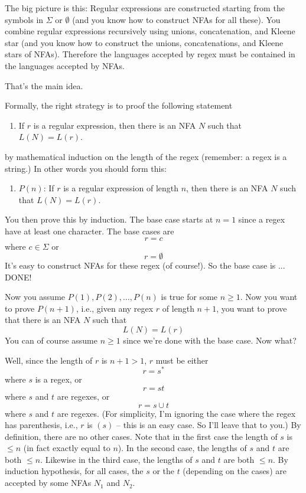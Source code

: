 

\newpage
The big picture is this:
Regular expressions are constructed starting from the symbols in $\Sigma$
or $\emptyset$
(and you know how to construct NFAs for all these).
You combine regular expressions recursively using
unions, concatenation, and Kleene star (and you know how to 
construct the unions, concatenations, and Kleene stars of NFAs).
Therefore the languages accepted by regex must be contained in the 
languages accepted by NFAs.

That's the main idea.

Formally, the right strategy is to proof the following statement
\begin{enumerate}
\item[]
If $r$ is a regular expression, then there is an NFA $N$
such that $L(N) = L(r)$.
\end{enumerate}
by mathematical induction on the length of the regex 
(remember: a regex is a string.)
In other words you should form this:
\begin{enumerate}
\item[]
$P(n)$: If $r$ is a regular expression of length $n$, 
then there is an NFA $N$
such that $L(N) = L(r)$.
\end{enumerate}

You then prove this by induction.
The base case starts at $n = 1$ since a regex have at least one character.
The base cases are 
\[
r = c
\]
where $c \in \Sigma$ or
\[
r = \emptyset
\]
It's easy to construct NFAs for these regex (of course!).
So the base case is ... DONE!

Now you assume $P(1), P(2), \ldots, P(n)$ is true for some $n \geq 1$.
Now you want to prove $P(n+1)$, i.e., 
given any regex $r$ of length $n + 1$, you want to 
prove that there is an NFA $N$ such that
\[
L(N) = L(r)
\]
You can of course assume $n \geq 1$ since we're done with the base case.
Now what?

Well, since the length of $r$ is $n + 1 > 1$, $r$ must be either
\[
r = s^*
\]
where $s$ is a regex, or
\[
r = st
\]
where $s$ and $t$ are regexes, or
\[
r = s \cup t
\]
where $s$ and $t$ are regexes.
(For simplicity, I'm ignoring the case where the regex has parenthesis,
i.e., $r$ is $(s)$ -- this is an easy case. So I'll leave that to you.)
By definition, there are no other cases.
Note that in the first case the length of $s$ is $\leq n$ (in fact
exactly equal to $n$).
In the second case, the lengths of $s$ and $t$ are both $\leq n$.
Likewise in the third case, the lengths of $s$ and $t$ are both $\leq n$.
By induction hypothesis, for all cases, the $s$ or the $t$
(depending on the cases) are accepted by some NFAs $N_1$ and $N_2$.


